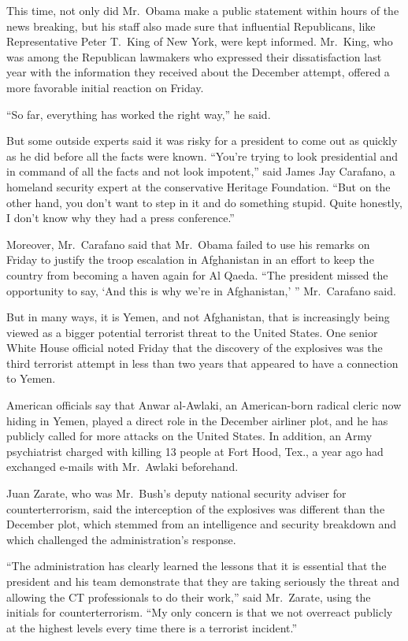 ﻿\documentclass[12pt]{article}
\begin{document}
This time, not only did Mr.~Obama make a public statement within hours of the news breaking, but his
staff also made sure that influential Republicans, like Representative Peter T.~King of New York,
were kept informed. Mr.~King, who was among the Republican lawmakers who expressed their
dissatisfaction last year with the information they received about the December attempt, offered a
more favorable initial reaction on Friday.

``So far, everything has worked the right way,'' he said.

But some outside experts said it was risky for a president to come out as quickly as he did before
all the facts were known. ``You're trying to look presidential and in command of all the facts and
not look impotent,'' said James Jay Carafano, a homeland security expert at the conservative
Heritage Foundation. ``But on the other hand, you don't want to step in it and do something stupid.
Quite honestly, I don't know why they had a press conference.''

Moreover, Mr.~Carafano said that Mr.~Obama failed to use his remarks on Friday to justify the troop
escalation in Afghanistan in an effort to keep the country from becoming a haven again for Al Qaeda.
``The president missed the opportunity to say, `And this is why we're in Afghanistan,' ''
Mr.~Carafano said.

But in many ways, it is Yemen, and not Afghanistan, that is increasingly being viewed as a bigger
potential terrorist threat to the United States. One senior White House official noted Friday that
the discovery of the explosives was the third terrorist attempt in less than two years that appeared
to have a connection to Yemen.

American officials say that Anwar al-Awlaki, an American-born radical cleric now hiding in Yemen,
played a direct role in the December airliner plot, and he has publicly called for more attacks on
the United States. In addition, an Army psychiatrist charged with killing 13 people at Fort Hood,
Tex., a year ago had exchanged e-mails with Mr.~Awlaki beforehand.

Juan Zarate, who was Mr.~Bush's deputy national security adviser for counterterrorism, said the
interception of the explosives was different than the December plot, which stemmed from an
intelligence and security breakdown and which challenged the administration's response.

``The administration has clearly learned the lessons that it is essential that the president and his
team demonstrate that they are taking seriously the threat and allowing the CT professionals to do
their work,'' said Mr.~Zarate, using the initials for counterterrorism. ``My only concern is that we
not overreact publicly at the highest levels every time there is a terrorist incident.''
\end{document}
